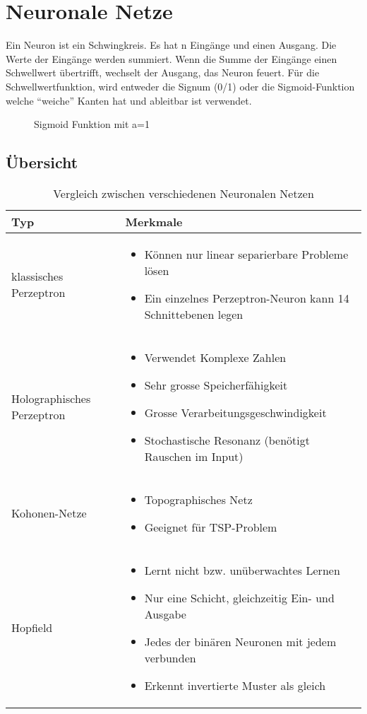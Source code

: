 \section{Neuronale Netze}
Ein Neuron ist ein Schwingkreis. Es hat n Eingänge und einen Ausgang. Die Werte der
Eingänge werden summiert. Wenn die Summe der Eingänge einen Schwellwert übertrifft, wechselt der Ausgang, das Neuron feuert.
Für die Schwellwertfunktion, wird entweder die Signum (0/1) oder die Sigmoid-Funktion welche ``weiche'' Kanten hat und ableitbar ist verwendet.
\begin{figure}[htb]
	\centering
	
	\caption{Sigmoid Funktion mit a=1}
\end{figure}
\subsection{Übersicht}
\begin{table}[htbp]
	\centering
	\begin{tabular}{l | p{8cm}}
		Typ & Merkmale \\
		\hline
		{klassisches Perzeptron} & {
			\begin{itemize}
				\item Können nur linear separierbare Probleme lösen
				\item Ein einzelnes Perzeptron-Neuron kann 14 Schnittebenen legen
			\end{itemize}
		}
		\\
		{Holographisches Perzeptron} & {
			\begin{itemize}
				\item Verwendet Komplexe Zahlen
				\item Sehr grosse Speicherfähigkeit
				\item Grosse Verarbeitungsgeschwindigkeit
				\item Stochastische Resonanz (benötigt Rauschen im Input)
			\end{itemize}
		}
		\\
		{Kohonen-Netze} & {
			\begin{itemize}
				\item Topographisches Netz
				\item Geeignet für TSP-Problem
			\end{itemize}
		}
		\\
		{Hopfield} & {
			\begin{itemize}
				\item Lernt nicht bzw. unüberwachtes Lernen
				\item Nur eine Schicht, gleichzeitig Ein- und Ausgabe
				\item Jedes der binären Neuronen mit jedem verbunden
				\item Erkennt invertierte Muster als gleich
			\end{itemize}
		}
	\end{tabular}
	\caption{Vergleich zwischen verschiedenen Neuronalen Netzen}
	\label{tab:nnetze}
\end{table}
